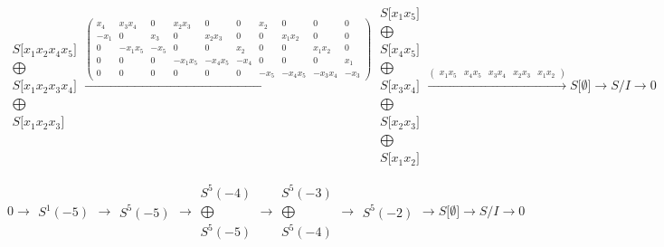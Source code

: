\documentclass[12pt,a3paper,landscape]{amsart}
\numberwithin{equation}{section}
\theoremstyle{plain}
\theoremstyle{definition}
\begin{document}
$$\begin{matrix}
S \lbrack x_{1}x_{2}x_{4}x_{5} \rbrack \\ \bigoplus \\
S \lbrack x_{1}x_{2}x_{3}x_{4} \rbrack \\ \bigoplus \\
S \lbrack x_{1}x_{2}x_{3} \rbrack
\end{matrix}
\xrightarrow{\left( \begin{matrix}
x_{4} & x_{3}x_{4} & 0 & x_{2}x_{3} & 0 & 0 & x_{2} & 0 & 0 & 0 \\
-x_{1} & 0 & x_{3} & 0 & x_{2}x_{3} & 0 & 0 & x_{1}x_{2} & 0 & 0 \\
0 & -x_{1}x_{5} & -x_{5} & 0 & 0 & x_{2} & 0 & 0 & x_{1}x_{2} & 0 \\
0 & 0 & 0 & -x_{1}x_{5} & -x_{4}x_{5} & -x_{4} & 0 & 0 & 0 & x_{1} \\
0 & 0 & 0 & 0 & 0 & 0 & -x_{5} & -x_{4}x_{5} & -x_{3}x_{4} & -x_{3}
\end{matrix} \right)}\begin{matrix}
S \lbrack x_{1}x_{5} \rbrack \\ \bigoplus \\
S \lbrack x_{4}x_{5} \rbrack \\ \bigoplus \\
S \lbrack x_{3}x_{4} \rbrack \\ \bigoplus \\
S \lbrack x_{2}x_{3} \rbrack \\ \bigoplus \\
S \lbrack x_{1}x_{2} \rbrack
\end{matrix}
\xrightarrow{\left( \begin{matrix}
x_{1}x_{5} & x_{4}x_{5} & x_{3}x_{4} & x_{2}x_{3} & x_{1}x_{2}
\end{matrix} \right)}S \lbrack \emptyset \rbrack \rightarrow S/I \rightarrow 0
$$

$$
0 \rightarrow \begin{matrix}
S^{1}(-5)
\end{matrix}
\rightarrow\begin{matrix}
S^{5}(-5)
\end{matrix}
\rightarrow\begin{matrix}
S^{5}(-4)\\ \bigoplus \\
S^{5}(-5)
\end{matrix}
\rightarrow\begin{matrix}
S^{5}(-3)\\ \bigoplus \\
S^{5}(-4)
\end{matrix}
\rightarrow\begin{matrix}
S^{5}(-2)
\end{matrix}
\rightarrow S \lbrack \emptyset \rbrack \rightarrow S/I \rightarrow 0
$$
\end{document}
